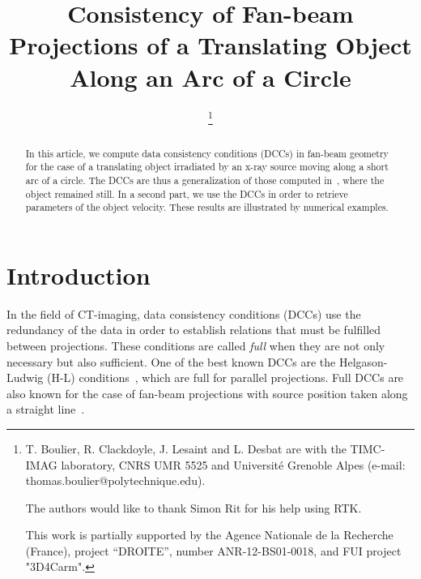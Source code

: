\documentclass[twocolumn]{IEEEtran}
\title{Consistency of Fan-beam Projections of a Translating Object Along an Arc of a Circle}
\date{}
\begin{document}
\author{
	\thanks{T. Boulier, R. Clackdoyle, J. Lesaint and L. Desbat are with the TIMC-IMAG laboratory, CNRS UMR 5525 and Universit\'e Grenoble Alpes (e-mail: thomas.boulier@polytechnique.edu).

	The authors would like to thank Simon Rit for his help using RTK.
			
	This work is partially supported by the Agence Nationale de la Recherche (France), project ``DROITE'', number ANR-12-BS01-0018, and FUI project "3D4Carm".
}		
\IEEEauthorblockA{}
}

\maketitle

\begin{abstract}
In this article, we compute data consistency conditions (DCCs) in fan-beam geometry for the case of a translating object irradiated by an x-ray source moving along a short arc of a circle. The DCCs are thus a generalization of those computed in~\cite{clackdoyle2015consistency}, where the object remained still. In a second part, we use the DCCs in order to retrieve parameters of the object velocity. These results are illustrated by numerical examples.
\end{abstract}

\section{Introduction}

In the field of CT-imaging, data consistency conditions (DCCs) use the redundancy of the data in order to establish relations that must be fulfilled  between projections. These conditions are called \emph{full} when they are not only necessary but also sufficient. One of the best known DCCs are the Helgason-Ludwig (H-L) conditions~\cite{helgason1980radon,ludwig1966radon}, which are full for parallel projections. Full DCCs are also known for the case of fan-beam projections with source position taken along a straight line~\cite{clackdoyle2013necessary}.
\end{document}

